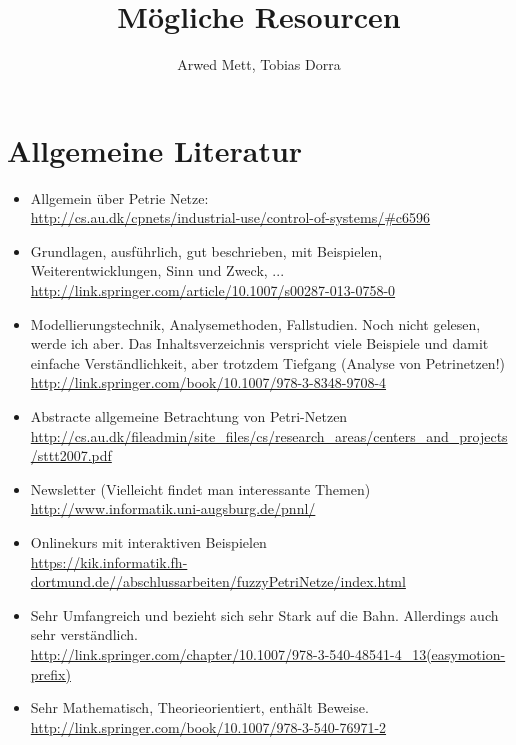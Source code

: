 \documentclass{article}
\author{Arwed Mett, Tobias Dorra}
\title{Mögliche Resourcen}
\begin{document}
\maketitle

\section{Allgemeine Literatur}
\begin{itemize}
    \item Allgemein über Petrie Netze:\\
        \url{http://cs.au.dk/cpnets/industrial-use/control-of-systems/#c6596}
    \item Grundlagen, ausführlich, gut beschrieben, mit Beispielen, Weiterentwicklungen, Sinn und Zweck, ...
         \url{http://link.springer.com/article/10.1007/s00287-013-0758-0}
    \item Modellierungstechnik, Analysemethoden, Fallstudien. Noch nicht gelesen, werde ich aber. Das Inhaltsverzeichnis verspricht viele Beispiele und damit einfache Verständlichkeit, aber trotzdem Tiefgang (Analyse von Petrinetzen!)
        \url{http://link.springer.com/book/10.1007/978-3-8348-9708-4}
    \item Abstracte allgemeine Betrachtung von Petri-Netzen\\
        \url{http://cs.au.dk/fileadmin/site_files/cs/research_areas/centers_and_projects/sttt2007.pdf}
    \item Newsletter (Vielleicht findet man interessante Themen)
        \url{http://www.informatik.uni-augsburg.de/pnnl/}
    \item Onlinekurs mit interaktiven Beispielen \\
        \url{https://kik.informatik.fh-dortmund.de//abschlussarbeiten/fuzzyPetriNetze/index.html}
    \item Sehr Umfangreich und bezieht sich sehr Stark auf die Bahn. Allerdings auch sehr verständlich.\\
        \url{http://link.springer.com/chapter/10.1007/978-3-540-48541-4_13(easymotion-prefix)}
    \item Sehr Mathematisch,  Theorieorientiert, enthält Beweise.
        \url{http://link.springer.com/book/10.1007/978-3-540-76971-2}
\end{itemize}
\end{document}
